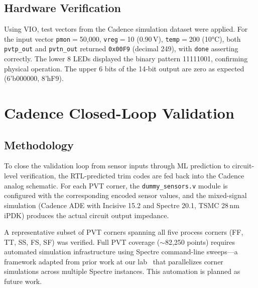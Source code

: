 \documentclass[lettersize,journal]{IEEEtran}
\begin{document}
\subsection{Hardware Verification}
Using VIO, test vectors from the Cadence simulation dataset were applied. For the input vector \texttt{pmon}$=$50,000, \texttt{vreg}$=$10 (0.90\,V), \texttt{temp}$=$200 (10°C), both \texttt{pvtp\_out} and \texttt{pvtn\_out} returned \texttt{0x00F9} (decimal 249), with \texttt{done} asserting correctly. The lower 8 LEDs displayed the binary pattern 11111001, confirming physical operation. The upper 6 bits of the 14-bit output are zero as expected ({6'b000000, 8'hF9}).

%


\section{Cadence Closed-Loop Validation}\label{sec:cadence}

\subsection{Methodology}
To close the validation loop from sensor inputs through ML prediction to circuit-level verification, the RTL-predicted trim codes are fed back into the Cadence analog schematic. For each PVT corner, the \texttt{dummy\_sensors.v} module is configured with the corresponding encoded sensor values, and the mixed-signal simulation (Cadence ADE with Incisive 15.2 and Spectre 20.1, TSMC 28\,nm iPDK) produces the actual circuit output impedance.

A representative subset of PVT corners spanning all five process corners (FF, TT, SS, FS, SF) was verified. Full PVT coverage ($\sim$82,250 points) requires automated simulation infrastructure using Spectre command-line sweeps---a framework adapted from prior work at our lab~\cite{Script_python_ref} that parallelizes corner simulations across multiple Spectre instances. This automation is planned as future work.
\end{document}
